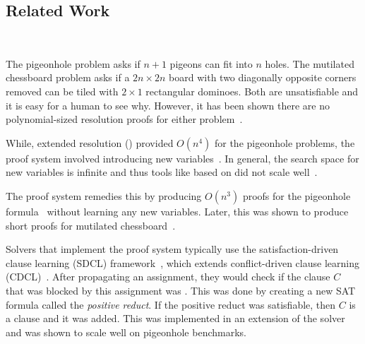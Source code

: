 



\subsection{Related Work}~\label{subsec:relatedwork}

The pigeonhole problem asks if $n+1$ pigeons can fit into $n$ holes. The
mutilated chessboard problem asks if a $2n \times 2n$ board with two diagonally
opposite corners removed can be tiled with $2 \times 1$ rectangular dominoes.
Both are unsatisfiable and it is easy for a human to see why. However, it has
been shown there are no polynomial-sized resolution proofs for either
problem~\cite{hakenpigeonhole,mutilatedchessboard-exponential}.




 While, extended resolution (\er) provided $O(n^4)$ for the pigeonhole problems, the proof system involved introducing new variables~\cite{er}. In general, the search space for new variables is infinite and thus tools like \glucoser based on \er did not scale well~\cite{glucoser}.

The \pr proof system remedies this by producing $O(n^3)$ proofs for the pigeonhole formula~\cite{prclauses} without learning any new variables. Later, this was shown to produce short proofs for mutilated chessboard~\cite{mutilatedchessboard-pr}. 

Solvers that implement the \pr proof system typically use the satisfaction-driven clause learning (SDCL) framework~\cite{sdcl}, which extends conflict-driven clause learning (CDCL)~\cite{cdcl}. 
After propagating an assignment, they would check if the clause $C$ that was blocked by this assignment was \pr. This was done by creating a new SAT formula called the \emph{positive reduct}. If the positive reduct was satisfiable, then $C$ is a \pr clause and it was added. This was implemented in an extension of the solver \lingeling and was shown to scale well on pigeonhole benchmarks.


